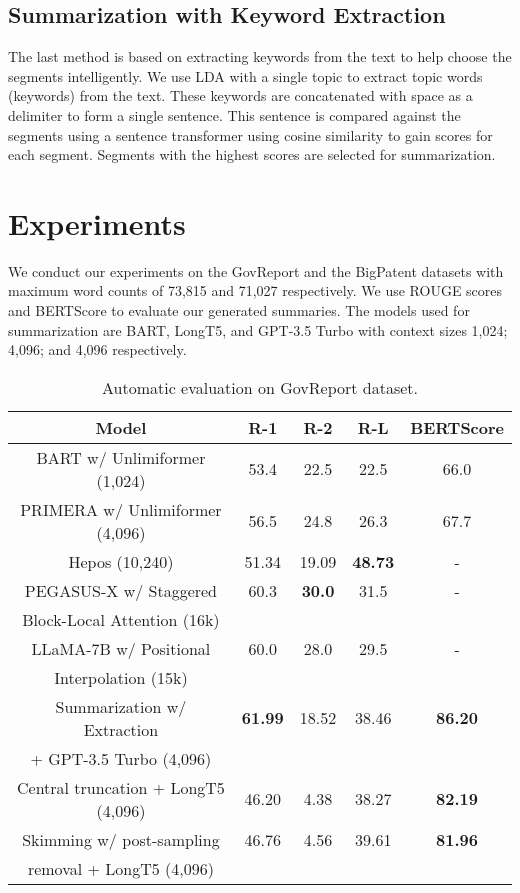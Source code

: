 \documentclass[letterpaper]{article} %
\begin{document}
	\subsection{Summarization with Keyword Extraction}
		
		The last method is based on extracting keywords from the text to help choose the
		segments intelligently.
		We use LDA \cite{blei2003latent} with a single topic to extract topic words (keywords)
		from the text.
		These keywords are concatenated with space as a delimiter to form a single sentence.
		This sentence is compared against the segments using a sentence transformer using
		cosine similarity to gain scores for each segment.
		Segments with the highest scores are selected for summarization.


\section{Experiments}

	We conduct our experiments on the GovReport \cite{huang-etal-2021-efficient} and the
	BigPatent \cite{sharma-etal-2019-bigpatent} datasets with maximum word counts of 73,815 and
	71,027 respectively.
	We use ROUGE scores \cite{lin-2004-rouge} and BERTScore \cite{zhang2019bertscore} to evaluate
	our generated summaries.
	The models used for summarization are BART, LongT5, and GPT-3.5 Turbo with context sizes
	1,024; 4,096; and 4,096 respectively.

	\begin{table}[!ht]
		\centering
		\scriptsize

		\begin{tabular}{c c c c c}
			\hline
			Model & R-1 & R-2 & R-L & BERTScore \\
			\hline
			BART w/ Unlimiformer (1,024) & 53.4 & 22.5 & 22.5 & 66.0 \\
			PRIMERA w/ Unlimiformer (4,096) & 56.5 & 24.8 & 26.3 & 67.7 \\
			Hepos (10,240) & 51.34 & 19.09 & \textbf{48.73} & - \\
			PEGASUS-X w/ Staggered & 60.3 & \textbf{30.0} & 31.5 & - \\
			Block-Local Attention (16k) & & & & \\
			LLaMA-7B w/ Positional & 60.0 & 28.0 & 29.5 & - \\
			Interpolation (15k) & & & & \\
			\hline
			Summarization w/ Extraction & \textbf{61.99} & 18.52 & 38.46 & \textbf{86.20} \\
			+ GPT-3.5 Turbo (4,096) & & & & \\
			Central truncation + LongT5 (4,096) & 46.20 & 4.38 & 38.27 & \textbf{82.19} \\
			Skimming w/ post-sampling & 46.76 & 4.56 & 39.61 & \textbf{81.96} \\
			removal + LongT5 (4,096) & & & & \\
			\hline
		\end{tabular}

		\caption{Automatic evaluation on GovReport dataset.}
		\label{tab:govreport}
	\end{table}
\end{document}
